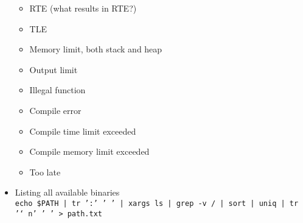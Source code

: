\begin{itemize}
\begin{itemize}
			\item RTE (what results in RTE?)
			\item TLE
			\item Memory limit, both stack and heap
			\item Output limit
			\item Illegal function
			\item Compile error
			\item Compile time limit exceeded
			\item Compile memory limit exceeded
			\item Too late
		\end{itemize}
	\item Listing all available binaries\\
		\texttt{echo \$PATH | tr ':' ' ' | xargs ls | grep -v / | sort | uniq | tr '\char`\\n' ' ' > path.txt}
\end{itemize}
